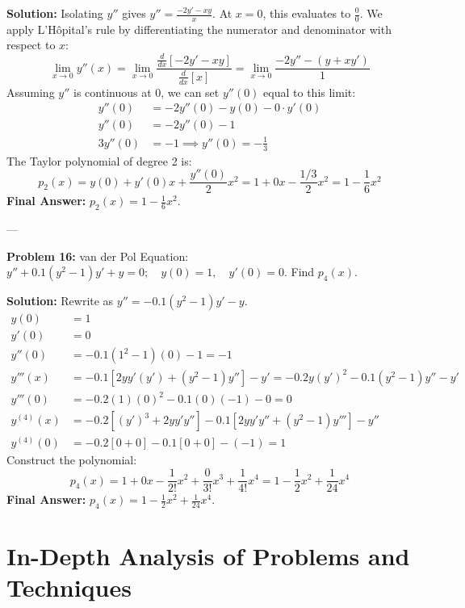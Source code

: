 \documentclass[11pt, letterpaper]{article}
\theoremstyle{definition}
\theoremstyle{remark}
\begin{document}
\textbf{Solution:}
Isolating $y''$ gives $y'' = \frac{-2y' - xy}{x}$. At $x=0$, this evaluates to $\frac{0}{0}$.
We apply L'Hôpital's rule by differentiating the numerator and denominator with respect to $x$:
\[ \lim_{x \to 0} y''(x) = \lim_{x \to 0} \frac{\frac{d}{dx}[-2y' - xy]}{\frac{d}{dx}[x]} = \lim_{x \to 0} \frac{-2y'' - (y + xy')}{1} \]
Assuming $y''$ is continuous at $0$, we can set $y''(0)$ equal to this limit:
\begin{align*}
    y''(0) &= -2y''(0) - y(0) - 0 \cdot y'(0) \\
    y''(0) &= -2y''(0) - 1 \\
    3y''(0) &= -1 \implies y''(0) = -\frac{1}{3}
\end{align*}
The Taylor polynomial of degree 2 is:
\[ p_2(x) = y(0) + y'(0)x + \frac{y''(0)}{2}x^2 = 1 + 0x - \frac{1/3}{2}x^2 = 1 - \frac{1}{6}x^2 \]
\textbf{Final Answer:} $p_2(x) = 1 - \frac{1}{6}x^2$.

---

\textbf{Problem 16:} van der Pol Equation: $y'' + 0.1(y^2 - 1)y' + y = 0 ; \quad y(0) = 1 , \quad y'(0) = 0$. Find $p_4(x)$.

\textbf{Solution:}
Rewrite as $y'' = -0.1(y^2 - 1)y' - y$.
\begin{align*}
    y(0) &= 1 \\
    y'(0) &= 0 \\
    y''(0) &= -0.1(1^2 - 1)(0) - 1 = -1 \\
    y'''(x) &= -0.1[2yy'(y') + (y^2 - 1)y''] - y' = -0.2y(y')^2 - 0.1(y^2 - 1)y'' - y' \\
    y'''(0) &= -0.2(1)(0)^2 - 0.1(0)(-1) - 0 = 0 \\
    y^{(4)}(x) &= -0.2[(y')^3 + 2yy'y''] - 0.1[2yy'y'' + (y^2 - 1)y'''] - y'' \\
    y^{(4)}(0) &= -0.2[0 + 0] - 0.1[0 + 0] - (-1) = 1
\end{align*}
Construct the polynomial:
\[ p_4(x) = 1 + 0x - \frac{1}{2!}x^2 + \frac{0}{3!}x^3 + \frac{1}{4!}x^4 = 1 - \frac{1}{2}x^2 + \frac{1}{24}x^4 \]
\textbf{Final Answer:} $p_4(x) = 1 - \frac{1}{2}x^2 + \frac{1}{24}x^4$.

\newpage
\section{In-Depth Analysis of Problems and Techniques}
\end{document}
